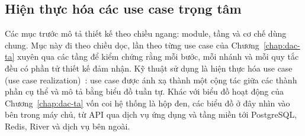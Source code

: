 \subsection{Hiện thực hóa các use case trọng tâm}\label{ssec:hien-thuc-uc}

Các mục trước mô tả thiết kế theo chiều ngang: module, tầng và cơ chế dùng chung. Mục này đi theo chiều dọc, lần theo từng use case của Chương~\ref{chap:dac-ta} xuyên qua các tầng để kiểm chứng rằng mỗi bước, mỗi nhánh và mỗi quy tắc đều có phần tử thiết kế đảm nhận. Kỹ thuật sử dụng là hiện thực hóa use case (use case realization)~\cite{uml251}: use case được ánh xạ thành một cộng tác giữa các thành phần cụ thể và mô tả bằng biểu đồ tuần tự. Khác với biểu đồ hoạt động của Chương~\ref{chap:dac-ta} vốn coi hệ thống là hộp đen, các biểu đồ ở đây nhìn vào bên trong máy chủ, từ API qua dịch vụ ứng dụng và tầng miền tới PostgreSQL, Redis, River và dịch vụ bên ngoài.

